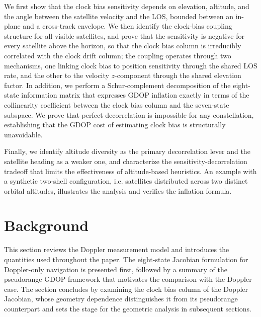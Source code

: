 \documentclass[letterpaper,times]{IONconf-v2}
\theoremstyle{plain}
\theoremstyle{remark}
\begin{document}
We first show that the clock bias sensitivity depends on elevation, altitude, and the angle between the satellite velocity and the LOS, bounded between an in-plane and a cross-track envelope. We then identify the clock-bias coupling structure for all visible satellites, and prove that the sensitivity is negative for every satellite above the horizon, so that the clock bias column is irreducibly correlated with the clock drift column; the coupling operates through two mechanisms, one linking clock bias to position sensitivity through the shared LOS rate, and the other to the velocity $z$-component through the shared elevation factor. In addition, we perform a Schur-complement decomposition of the eight-state information matrix that expresses GDOP inflation exactly in terms of the collinearity coefficient between the clock bias column and the seven-state subspace. We prove that perfect decorrelation is impossible for any constellation, establishing that the GDOP cost of estimating clock bias is structurally unavoidable.

Finally, we identify altitude diversity as the primary decorrelation lever and the satellite heading as a weaker one, and characterize the sensitivity-decorrelation tradeoff that limits the effectiveness of altitude-based heuristics. An example with a synthetic two-shell configuration, i.e. satellites distributed across two distinct orbital altitudes, illustrates the analysis and verifies the inflation formula.

\vspace{-10pt}

\section{Background}\label{sec:background}
\vspace{-5pt}

This section reviews the Doppler measurement model and introduces the quantities used throughout the paper. The eight-state Jacobian formulation for Doppler-only navigation is presented first, followed by a summary of the pseudorange GDOP framework that motivates the comparison with the Doppler case. The section concludes by examining the clock bias column of the Doppler Jacobian, whose geometry dependence distinguishes it from its pseudorange counterpart and sets the stage for the geometric analysis in subsequent sections.

\vspace{-10pt}
\end{document}

